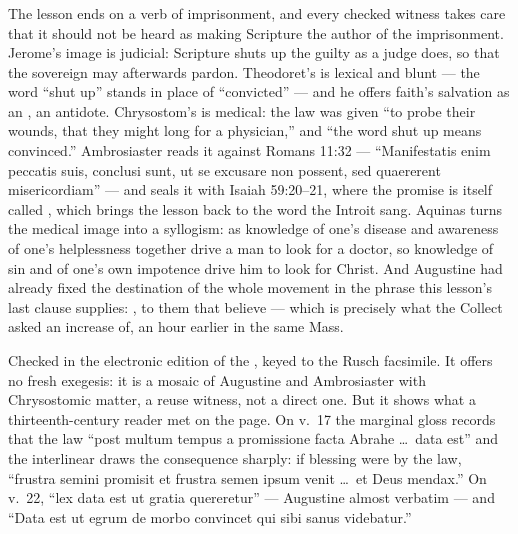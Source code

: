 \subsubsection*{}

The lesson ends on a verb of imprisonment, and every checked witness takes
care that it should not be heard as making Scripture the author of the
imprisonment. Jerome's image is judicial: Scripture shuts up the guilty as a
judge does, so that the sovereign may afterwards pardon. Theodoret's is
lexical and blunt --- the word ``shut up'' stands in place of ``convicted'' ---
and he offers faith's salvation as an , an antidote.
Chrysostom's is medical: the law was given ``to probe their wounds, that they
might long for a physician,'' and ``the word shut up means convinced.''
Ambrosiaster reads it against Romans 11:32 --- ``Manifestatis enim peccatis
suis, conclusi sunt, ut se excusare non possent, sed quaererent
misericordiam'' --- and seals it with Isaiah 59:20--21, where the promise is
itself called , which brings the lesson back to the word
the Introit sang. Aquinas turns the medical image into a syllogism: as
knowledge of one's disease and awareness of one's helplessness together drive
a man to look for a doctor, so knowledge of sin and of one's own impotence
drive him to look for Christ. And Augustine had already fixed the destination
of the whole movement in the phrase this lesson's last clause supplies:
, to them that believe --- which is precisely what the
Collect asked an increase of, an hour earlier in the same Mass.

\begin{witnessnote}
Checked in the electronic edition of the ,
keyed to the Rusch facsimile. It offers no fresh exegesis: it is a mosaic of
Augustine and Ambrosiaster with Chrysostomic matter, a reuse witness, not a
direct one. But it shows what a thirteenth-century reader met on the page. On v.~17 the marginal
gloss records that the law ``post multum tempus a promissione facta Abrahe
\dots\ data est'' and the interlinear draws the consequence sharply: if
blessing were by the law, ``frustra semini promisit et frustra semen ipsum
venit \dots\ et Deus mendax.'' On v.~22, ``lex data est ut gratia quereretur''
--- Augustine almost verbatim --- and ``Data est ut egrum de morbo convincet
qui sibi sanus videbatur.''
\end{witnessnote}

